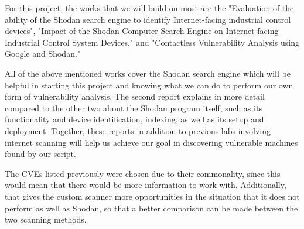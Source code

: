 
For this project, the works that we will build on most are the "Evaluation of
the ability of the Shodan search engine to identify Internet-facing industrial
control devices", "Impact of the Shodan Computer Search Engine on Internet-facing
Industrial Control System Devices," and "Contactless Vulnerability Analysis using
Google and Shodan."

All of the above mentioned works cover the Shodan search engine which will be
helpful in starting this project and knowing what we can do to perform our own
form of vulnerability analysis. The second report explains in more detail
compared to the other two about the Shodan program itself, such as its
functionality and device identification, indexing, as well as its setup and
deployment. Together, these reports in addition to previous labs involving
internet scanning will help us achieve our goal in discovering vulnerable
machines found by our script.

The CVEs listed previously were chosen due to their commonality, since this
would mean that there would be more information to work with. Additionally,
that gives the custom scanner more opportunities in the situation that it
does not perform as well as Shodan, so that a better comparison can be made
between the two scanning methods.

